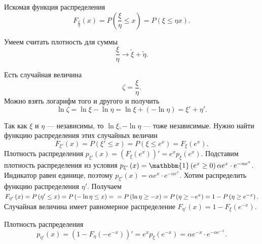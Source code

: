 Искомая функция распределения
$$F_{ \frac{ \xi }{ \eta }} \left( x \right) =
P \left( \frac{ \xi }{ \eta } \leq x \right) =
P \left( \xi \leq \eta x \right).$$

Умеем считать плотность для суммы
$$ \frac{ \xi }{ \eta } \rightarrow \tilde{ \xi } + \tilde{ \eta }.$$

Есть случайная величина
$$ \zeta =
\frac{ \xi }{ \eta }.$$
Можно взять логарифм того и другого и получить
$$ \ln \zeta =
\ln \xi - \ln \eta =
\ln \xi + \left( - \ln \eta \right) =
\xi' + \eta'.$$

Так как $ \xi $ и $ \eta $ --- независимы, то $ \ln \xi, - \ln \eta $ --- тоже независимые.
Нужно найти функцию распределения этих случайных величин
$$F_{ \xi'} \left( x \right) =
P \left( \xi' \leq x \right) =
P \left( \xi \leq e^x \right) =
F_{ \xi } \left( e^x \right).$$
Плотность распределения $p_{ \xi'} \left( x \right) = \left( F_{ \xi } \left( e^x \right) \right)' = e^x p_{ \xi } \left( e^x \right) $.
Подставим плотность распределения из условия $p_{ \xi'} \left( x \right) = \mathbbm{1} \left( e^x \geq 0 \right) \alpha e^x \cdot e^{- \alpha e^x}$.
Индикатор равен единице, поэтому $p_{ \xi'} \left( x \right) = \alpha e^x \cdot e^{- \alpha e^x}$.
Хотим распределить функцию распределения $ \eta'$.
Получаем
$F_{ \eta'} \left( x \right) =
P \left( \eta' \leq x \right) =
P \left( - \ln \eta \leq x \right) = \\
= P \left( \ln \eta \geq -x \right) =
P \left( \eta \geq -e^x \right) =
1 - P \left( \eta \geq e^{-x} \right).$
Случайная величина имеет равномерное распределение $F_{ \eta'} \left( x \right) = 1 - F_{ \xi } \left( e^{-x} \right) $.

Плотность распределения
$$p_{ \eta'} \left( x \right) =
\left( 1 - F_{ \eta } \left( -e^{-x} \right) \right)' =
e^x p_{ \xi } \left( e^{-x} \right) =
\alpha e^{-x} \cdot e^{- \alpha e^{-x}}.$$

